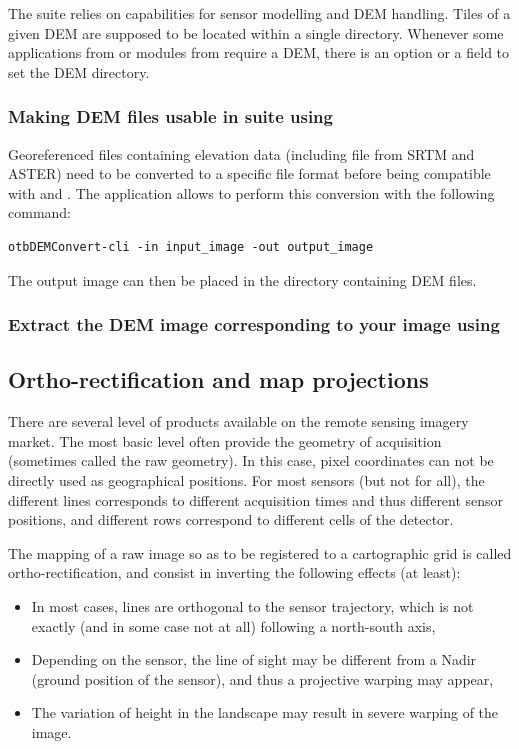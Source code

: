 The \otb suite relies on \ossim capabilities for sensor modelling and
DEM handling. Tiles of a given DEM are supposed to be located within a
single directory. Whenever some applications from \app or modules from
\mont require a DEM, there is an option or a field to set the DEM
directory.

\subsubsection{Making DEM files usable in \otb suite using \app}

Georeferenced files containing elevation data (including file from
SRTM and ASTER) need to be converted to a specific file format before
being compatible with \ossim and \otb. The
 application allows to perform this
conversion with the following command:

\begin{verbatim}
otbDEMConvert-cli -in input_image -out output_image
\end{verbatim}

The output image can then be placed in the directory containing DEM
files.

\subsubsection{Extract the DEM image corresponding to your image using
  \mont}


\subsection{Ortho-rectification and map projections}\label{ssec:ortho}

There are several level of products available on the remote sensing
imagery market. The most basic level often provide the geometry of
acquisition (sometimes called the raw geometry). In this case, pixel
coordinates can not be directly used as geographical positions. For
most sensors (but not for all), the different lines corresponds to
different acquisition times and thus different sensor positions, and
different rows correspond to different cells of the detector.

The mapping of a raw image so as to be registered to a cartographic
grid is called ortho-rectification, and consist in inverting the
following effects (at least):
\begin{itemize}
\item In most cases, lines are orthogonal to the sensor trajectory,
 which is not exactly (and in some case not at all) following a
 north-south axis,
\item Depending on the sensor, the line of sight may be different from
  a Nadir (ground position of the sensor), and thus a projective
  warping may appear,
\item The variation of height in the landscape may result in severe
  warping of the image.
\end{itemize}

